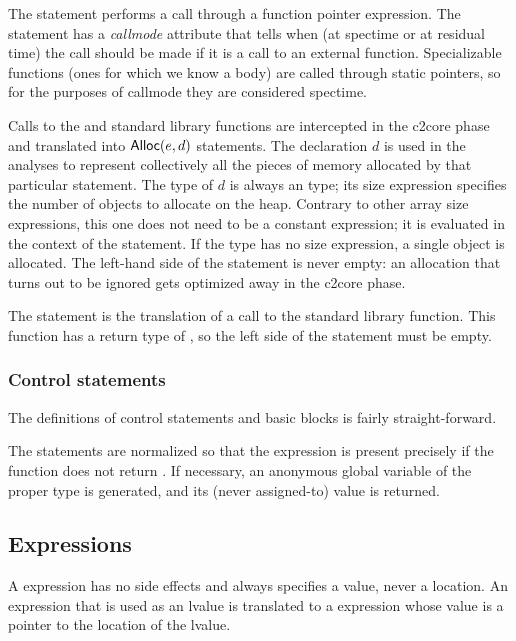 \begin{docpart}
The  statement performs a call through a function pointer
expression. The statement has a \emph{callmode} attribute that
tells when (at spectime or at residual time)
the call should be made if it is a call to an external function.
Specializable functions (ones for which we know a body) are called
through static pointers, so for the purposes of callmode they are
considered spectime.

Calls to the  and  standard library
functions are intercepted in the c2core phase and translated into
$\textsf{Alloc}(e,d)$ statements.
The declaration
$d$ is used in the analyses to represent collectively all the pieces
of memory allocated by that particular  statement.
The type of $d$ is always an  type; its size expression
specifies the number of objects to allocate on the heap. Contrary to
other array size expressions, this one does not need to be a constant
expression; it is evaluated in the context of the 
statement. If the  type has no size expression, a single
object is allocated.
The left-hand side of the  statement is never empty:
an allocation that turns out to be ignored gets optimized away
in the c2core phase.

The  statement is the translation of a call to the
 standard library function. This function has a return
type of , so the left side of the statement must be
empty.

\subsubsection{Control statements}
The definitions of control statements and basic blocks is fairly
straight-forward.

The  statements are normalized so that the expression
is present precisely if the function does not return .
If necessary, an anonymous global variable of the proper type is
generated, and its (never assigned-to) value is returned.

\subsection{Expressions}

A \coreC expression has no side effects and always specifies a
value, never a location. An \ansiC expression that is used as
an lvalue is translated to a \coreC expression whose value is
a pointer to the location of the lvalue.


\end{docpart}
